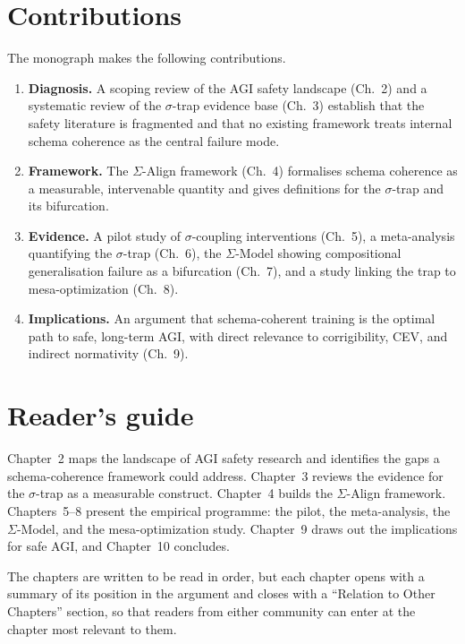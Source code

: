 \section{Contributions}

The monograph makes the following contributions.

\begin{enumerate}
  \item \textbf{Diagnosis.} A scoping review of the AGI safety landscape (Ch.~2) and a
    systematic review of the $\sigma$-trap evidence base (Ch.~3) establish that the
    safety literature is fragmented and that no existing framework treats internal
    schema coherence as the central failure mode.
  \item \textbf{Framework.} The $\Sigma$-Align framework (Ch.~4) formalises schema
    coherence as a measurable, intervenable quantity and gives definitions for the
    $\sigma$-trap and its bifurcation.
  \item \textbf{Evidence.} A pilot study of $\sigma$-coupling interventions (Ch.~5),
    a meta-analysis quantifying the $\sigma$-trap (Ch.~6), the $\Sigma$-Model showing
    compositional generalisation failure as a bifurcation (Ch.~7), and a study linking
    the trap to mesa-optimization (Ch.~8).
  \item \textbf{Implications.} An argument that schema-coherent training is the
    optimal path to safe, long-term AGI, with direct relevance to corrigibility, CEV,
    and indirect normativity (Ch.~9).
\end{enumerate}

\section{Reader's guide}

Chapter~2 maps the landscape of AGI safety research and identifies the gaps a
schema-coherence framework could address. Chapter~3 reviews the evidence for the
$\sigma$-trap as a measurable construct. Chapter~4 builds the $\Sigma$-Align
framework. Chapters~5--8 present the empirical programme: the pilot, the
meta-analysis, the $\Sigma$-Model, and the mesa-optimization study. Chapter~9 draws
out the implications for safe AGI, and Chapter~10 concludes.

The chapters are written to be read in order, but each chapter opens with a summary of
its position in the argument and closes with a ``Relation to Other Chapters'' section,
so that readers from either community can enter at the chapter most relevant to them.
